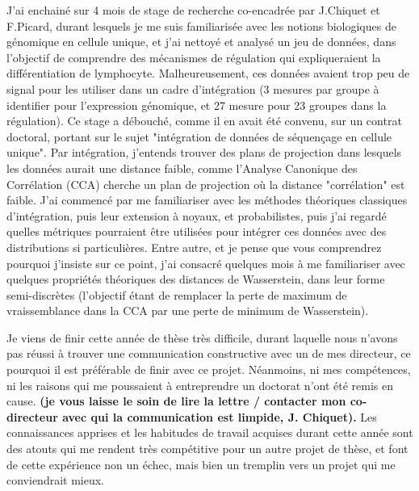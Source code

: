 \documentclass[a4paper,12pt]{article}
\begin{document}
J'ai enchainé sur 4 mois de stage de recherche co-encadrée par J.Chiquet et F.Picard, durant lesquels je me suis familiarisée avec les notions biologiques de génomique en cellule unique, et j'ai nettoyé et analysé un jeu de données, dans l'objectif de comprendre des mécanismes de régulation qui expliqueraient la différentiation de lymphocyte. Malheureusement, ces données avaient trop peu de signal pour les utiliser dans un cadre d'intégration (3 mesures par groupe à identifier pour l'expression génomique, et 27 mesure pour 23 groupes dans la régulation). Ce stage a débouché, comme il en avait été convenu, sur un contrat doctoral, portant sur le sujet "intégration de données de séquençage en cellule unique". 
Par intégration, j'entends trouver des plans de projection dans lesquels les données aurait une distance faible, comme l'Analyse Canonique des Corrélation (CCA) cherche un plan de projection où la distance "corrélation" est faible. J'ai commencé par me familiariser avec les méthodes théoriques classiques d'intégration, puis leur extension à noyaux, et probabilistes, puis j'ai regardé quelles métriques pourraient être utilisées pour intégrer ces données avec des distributions si particulières. Entre autre, et je pense que vous comprendrez pourquoi j'insiste sur ce point, j'ai consacré quelques mois à me familiariser avec quelques propriétés théoriques des distances de Wasserstein, dans leur forme semi-discrètes (l'objectif étant de remplacer la perte de maximum de vraissemblance dans la CCA par une perte de minimum de Wasserstein). 

Je viens de finir cette année de thèse très difficile, durant laquelle nous n'avons pas réussi à trouver une communication constructive avec un de mes directeur, ce pourquoi il est préférable de finir avec ce projet. Néanmoins, ni mes compétences, ni les raisons qui me poussaient à entreprendre un doctorat n'ont été remis en cause.\textbf{ (je vous laisse le soin de lire la lettre / contacter mon co-directeur avec qui la communication est limpide, J. Chiquet).}
Les connaissances apprises et les habitudes de travail acquises durant cette année sont des atouts qui me rendent très compétitive pour un autre projet de thèse, et font de cette expérience non un échec, mais bien un tremplin vers un projet qui me conviendrait mieux.
\end{document}
